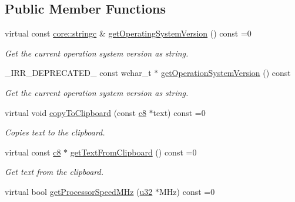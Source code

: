 \subsection*{Public Member Functions}
\begin{DoxyCompactItemize}
\item 
\mbox{\label{classirr_1_1IOSOperator_acf89b7715468ad2af91807dea6d40bf8}} 
virtual const \hyperlink{namespaceirr_1_1core_ade1071a878633f2f6d8a75c5d11fec19}{core\+::stringc} \& \hyperlink{classirr_1_1IOSOperator_acf89b7715468ad2af91807dea6d40bf8}{get\+Operating\+System\+Version} () const =0
\begin{DoxyCompactList}\small\item\em Get the current operation system version as string. \end{DoxyCompactList}\item 
\+\_\+\+I\+R\+R\+\_\+\+D\+E\+P\+R\+E\+C\+A\+T\+E\+D\+\_\+ const wchar\+\_\+t $\ast$ \hyperlink{classirr_1_1IOSOperator_a8d634ee79439742b7397ca7ad7a3812a}{get\+Operation\+System\+Version} () const
\begin{DoxyCompactList}\small\item\em Get the current operation system version as string. \end{DoxyCompactList}\item 
\mbox{\label{classirr_1_1IOSOperator_aba3b621ed3b64e5a421c42b06b49e0b6}} 
virtual void \hyperlink{classirr_1_1IOSOperator_aba3b621ed3b64e5a421c42b06b49e0b6}{copy\+To\+Clipboard} (const \hyperlink{namespaceirr_a9395eaea339bcb546b319e9c96bf7410}{c8} $\ast$text) const =0
\begin{DoxyCompactList}\small\item\em Copies text to the clipboard. \end{DoxyCompactList}\item 
virtual const \hyperlink{namespaceirr_a9395eaea339bcb546b319e9c96bf7410}{c8} $\ast$ \hyperlink{classirr_1_1IOSOperator_a9026ff9f28b48615971e18fcee6fff4c}{get\+Text\+From\+Clipboard} () const =0
\begin{DoxyCompactList}\small\item\em Get text from the clipboard. \end{DoxyCompactList}\item 
virtual bool \hyperlink{classirr_1_1IOSOperator_abc61b8016ec35125ef94adea42209ecd}{get\+Processor\+Speed\+M\+Hz} (\hyperlink{namespaceirr_a0416a53257075833e7002efd0a18e804}{u32} $\ast$M\+Hz) const =0

\end{DoxyCompactItemize}
